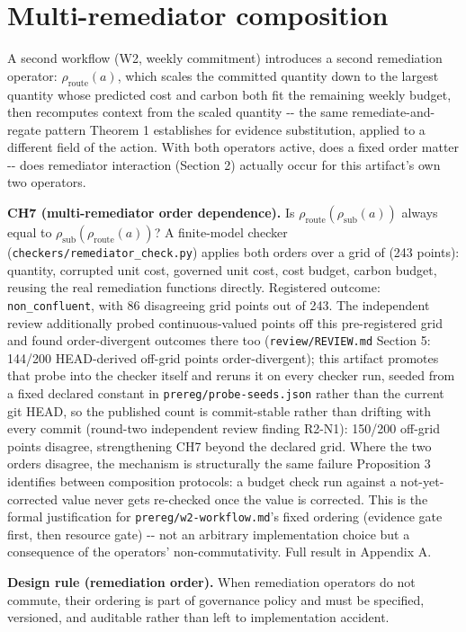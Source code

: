 \documentclass[11pt,a4paper]{article}
\theoremstyle{definition}
\newcommand{\rhosub}{\rho_{\mathrm{sub}}}
\newcommand{\rhoroute}{\rho_{\mathrm{route}}}
\begin{document}
\section{Multi-remediator composition}

A second workflow (W2, weekly commitment) introduces a second remediation operator: $\rhoroute(a)$, which scales the committed quantity down to the largest quantity whose predicted cost and carbon both fit the remaining weekly budget, then recomputes context from the scaled quantity -{}- the same remediate-and-regate pattern Theorem 1 establishes for evidence substitution, applied to a different field of the action. With both operators active, does a fixed order matter -{}- does remediator interaction (Section 2) actually occur for this artifact's own two operators.

\noindent\textbf{CH7 (multi-remediator order dependence).} Is $\rhoroute(\rhosub(a))$ always equal to $\rhosub(\rhoroute(a))$? A finite-model checker (\texttt{checkers/remediator\_check.py}) applies both orders over a grid of (243 points): quantity, corrupted unit cost, governed unit cost, cost budget, carbon budget, reusing the real remediation functions directly. Registered outcome: \texttt{non\_confluent}, with 86 disagreeing grid points out of 243. The independent review additionally probed continuous-valued points off this pre-registered grid and found order-divergent outcomes there too (\texttt{review/REVIEW.md} Section 5: 144/200 HEAD-derived off-grid points order-divergent); this artifact promotes that probe into the checker itself and reruns it on every checker run, seeded from a fixed declared constant in \texttt{prereg/probe-seeds.json} rather than the current git HEAD, so the published count is commit-stable rather than drifting with every commit (round-two independent review finding R2-N1): 150/200 off-grid points disagree, strengthening CH7 beyond the declared grid. Where the two orders disagree, the mechanism is structurally the same failure Proposition 3 identifies between composition protocols: a budget check run against a not-yet-corrected value never gets re-checked once the value is corrected. This is the formal justification for \texttt{prereg/w2-workflow.md}'s fixed ordering (evidence gate first, then resource gate) -{}- not an arbitrary implementation choice but a consequence of the operators' non-commutativity. Full result in Appendix A.

\noindent\textbf{Design rule (remediation order).} When remediation operators do not commute, their ordering is part of governance policy and must be specified, versioned, and auditable rather than left to implementation accident.
\end{document}
